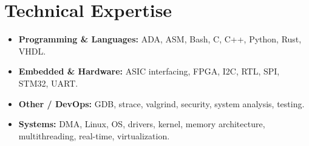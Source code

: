 \documentclass[9pt,a4paper]{article}
\begin{document}
\section*{Technical Expertise}
\begin{tcolorbox}[mybox]
\begin{itemize}
\item \textbf{Programming \& Languages:} ADA, ASM, Bash, C, C++, Python, Rust, VHDL.

\item \textbf{Embedded \& Hardware:} ASIC interfacing, FPGA, I2C, RTL, SPI, STM32, UART.

\item \textbf{Other / DevOps:} GDB, strace, valgrind, security, system analysis, testing.

\item \textbf{Systems:} DMA, Linux, OS, drivers, kernel, memory architecture, multithreading, real-time, virtualization.
\end{itemize}
\end{tcolorbox}
\end{document}
